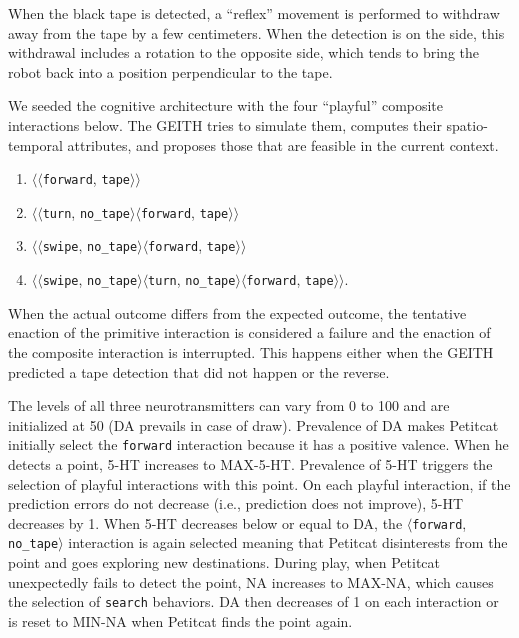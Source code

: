 \documentclass[runningheads]{llncs}
\begin{document}
When the black tape is detected, a ``reflex'' movement is performed to withdraw away from the tape by a few centimeters. 
When the detection is on the side, this withdrawal includes a rotation to the opposite side, which tends to bring the robot back into a position perpendicular to the tape.

We seeded the cognitive architecture with the four ``playful'' composite interactions below. 
The GEITH tries to simulate them, computes their spatio-temporal attributes, and proposes those that are feasible in the current context.
\begin{enumerate}
	\item $\langle\langle$\texttt{forward}, \texttt{tape}$\rangle\rangle$
	\item $\langle\langle$\texttt{turn}, \texttt{no\_tape}$\rangle\langle$\texttt{forward}, \texttt{tape}$\rangle\rangle$
	\item $\langle\langle$\texttt{swipe}, \texttt{no\_tape}$\rangle\langle$\texttt{forward}, \texttt{tape}$\rangle\rangle$
	\item $\langle\langle$\texttt{swipe}, \texttt{no\_tape}$\rangle\langle$\texttt{turn}, \texttt{no\_tape}$\rangle\langle$\texttt{forward}, \texttt{tape}$\rangle\rangle$. 
\end{enumerate}

When the actual outcome differs from the expected outcome, the tentative enaction of the primitive interaction is considered a failure and the enaction of the composite interaction is interrupted. 
This happens either when the GEITH predicted a tape detection that did not happen or the reverse. 

The levels of all three neurotransmitters can vary from 0 to 100 and are initialized at 50 (DA prevails in case of draw).
Prevalence of DA makes Petitcat initially select the \texttt{forward} interaction because it has a positive valence.
When he detects a point, 5-HT increases to MAX-5-HT. Prevalence of 5-HT triggers the selection of playful interactions with this point.
On each playful interaction, if the prediction errors do not decrease (i.e., prediction does not improve), 5-HT decreases by 1.
When 5-HT decreases below or equal to DA, the  $\langle$\texttt{forward}, \texttt{no\_tape}$\rangle$ interaction is again selected meaning that Petitcat disinterests from the point and goes exploring new destinations. 
During play, when Petitcat unexpectedly fails to detect the point, NA increases to MAX-NA, which causes the selection of \texttt{search} behaviors. 
DA then decreases of 1 on each interaction or is reset to MIN-NA when Petitcat finds the point again.  
\end{document}

